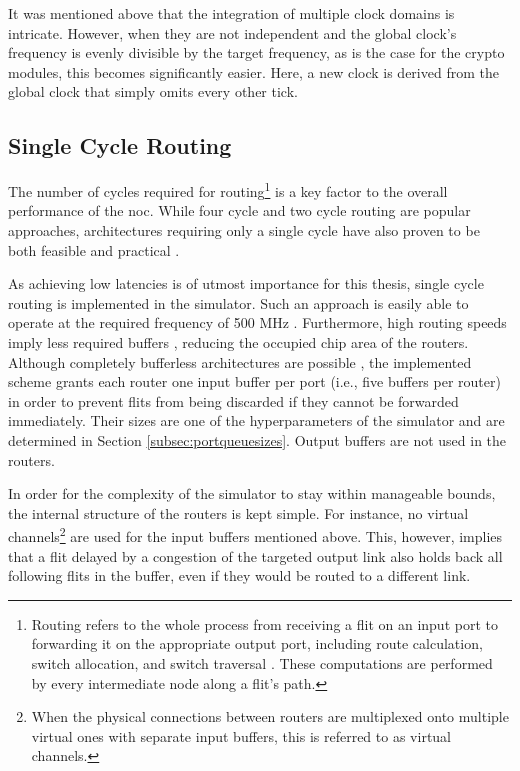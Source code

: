 It was mentioned above that the integration of multiple clock domains is intricate. However, when they are not independent and the global clock's
frequency is evenly divisible by the target frequency, as is the case for the crypto modules, this becomes significantly easier. Here, a new clock
is derived from the global clock that simply omits every other tick.

\subsection{Single Cycle Routing}\label{subsec:singlecyclerouting}
The number of cycles required for routing\footnote{Routing refers to the whole process from receiving a flit on an input port to forwarding it on the
appropriate output port, including route calculation, switch allocation, and switch traversal \cite[see][2]{routinglectureutah}. These computations
are performed by every intermediate node along a flit's path.} is a key factor to the
overall performance of the \gls{noc}. While four cycle \cite[e.g.][]{routinglectureutah} and two cycle routing \cite[e.g.][]{lu11nocrouter} are
popular approaches, architectures requiring only a single cycle have also proven to be both feasible and practical
\cites{hayenga09scarab}{ved17routeonfly}.

As achieving low latencies is of utmost importance for this thesis, single cycle routing is implemented in the simulator. Such an approach is easily
able to operate at the required frequency of 500 MHz \cite[7]{hayenga09scarab}. Furthermore, high routing speeds imply less required buffers
\cite[1]{ved17routeonfly}, reducing the occupied chip area of the routers. Although completely bufferless architectures are possible
\cite{hayenga09scarab}, the implemented scheme grants each router one input buffer per port (i.e., five buffers per router) in order to prevent
flits from being discarded if they cannot be forwarded immediately. Their sizes are one of the hyperparameters of the simulator and are determined in
Section \ref{subsec:portqueuesizes}. Output buffers are not used in the routers.

In order for the complexity of the simulator to stay within manageable bounds, the internal structure of the routers is kept simple. For instance, no
virtual channels\footnote{When the physical connections between routers are multiplexed onto multiple virtual ones with separate input
buffers, this is referred to as virtual channels.} are used for the input buffers mentioned above. This, however, implies that a flit delayed by a
congestion of the targeted output
link also holds back all following flits in the buffer, even if they would be routed to a different link.

